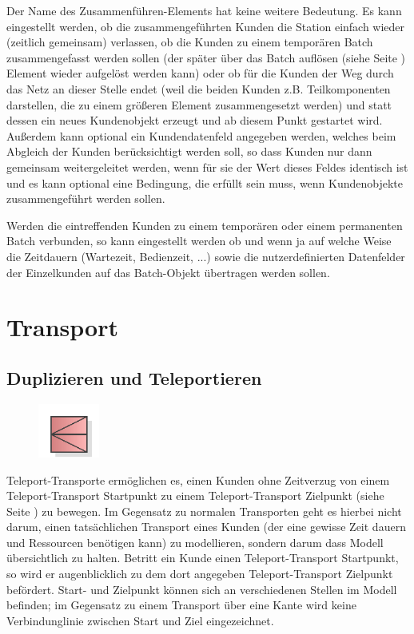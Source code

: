 Der Name des Zusammenführen-Elements hat keine weitere Bedeutung. Es kann eingestellt werden, ob die zusammengeführten
Kunden die Station einfach wieder (zeitlich gemeinsam) verlassen, ob die Kunden zu einem temporären
Batch zusammengefasst werden sollen (der später über das Batch auflösen (siehe Seite \pageref{ref:ModelElementSeparate}) Element
wieder aufgelöst werden kann) oder ob für die Kunden der Weg durch das Netz an
dieser Stelle endet (weil die beiden Kunden z.B. Teilkomponenten darstellen, die zu einem größeren Element zusammengesetzt
werden) und statt dessen ein neues Kundenobjekt erzeugt und ab diesem Punkt gestartet wird.
Außerdem kann optional ein Kundendatenfeld angegeben werden, welches beim Abgleich der Kunden berücksichtigt werden soll,
so dass Kunden nur dann gemeinsam weitergeleitet werden, wenn für sie der Wert dieses Feldes identisch ist und es kann
optional eine Bedingung, die erfüllt sein muss, wenn Kundenobjekte zusammengeführt werden sollen.

Werden die eintreffenden Kunden zu einem temporären oder einem permanenten Batch verbunden, so kann eingestellt werden
ob und wenn ja auf welche Weise die Zeitdauern (Wartezeit, Bedienzeit, ...) sowie die nutzerdefinierten Datenfelder
der Einzelkunden auf das Batch-Objekt übertragen werden sollen.





\chapter{Transport}

\section{Duplizieren und Teleportieren}
\label{ref:ModelElementTeleportSourceMulti}

\begin{figure}
\vspace{-22pt}
\includegraphics[width=2cm]{imageModelElementTeleportSourceMulti.png}
\vspace{-22pt}
\end{figure}

Teleport-Transporte ermöglichen es, einen Kunden ohne Zeitverzug
von einem Teleport-Transport Startpunkt zu einem 
Teleport-Transport Zielpunkt (siehe Seite \pageref{ref:ModelElementTeleportDestination}) 
zu bewegen. Im Gegensatz zu normalen Transporten geht es hierbei nicht darum,
einen tatsächlichen Transport eines Kunden (der eine gewisse Zeit dauern und
Ressourcen benötigen kann) zu modellieren, sondern darum dass Modell übersichtlich
zu halten. Betritt ein Kunde einen Teleport-Transport Startpunkt, so wird er
augenblicklich zu dem dort angegeben Teleport-Transport Zielpunkt befördert.
Start- und Zielpunkt können sich an verschiedenen Stellen im Modell befinden;
im Gegensatz zu einem Transport über eine Kante wird keine Verbindunglinie
zwischen Start und Ziel eingezeichnet.

